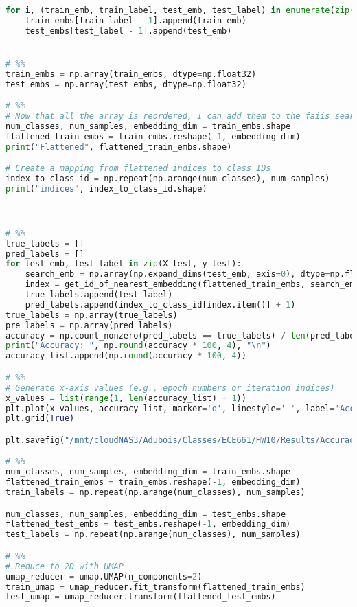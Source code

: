\documentclass{article}
\begin{document}
\begin{lstlisting}[language=Python]
for i, (train_emb, train_label, test_emb, test_label) in enumerate(zip(X_train, y_train, X_test, y_test)):
    train_embs[train_label - 1].append(train_emb)
    test_embs[test_label - 1].append(test_emb)


# %%
train_embs = np.array(train_embs, dtype=np.float32)
test_embs = np.array(test_embs, dtype=np.float32)

# %%
# Now that all the array is reordered, I can add them to the faiis search
num_classes, num_samples, embedding_dim = train_embs.shape
flattened_train_embs = train_embs.reshape(-1, embedding_dim)
print("Flattened", flattened_train_embs.shape)

# Create a mapping from flattened indices to class IDs
index_to_class_id = np.repeat(np.arange(num_classes), num_samples)
print("indices", index_to_class_id.shape)



# %%
true_labels = []
pred_labels = []
for test_emb, test_label in zip(X_test, y_test):
    search_emb = np.array(np.expand_dims(test_emb, axis=0), dtype=np.float32)
    index = get_id_of_nearest_embedding(flattened_train_embs, search_emb)
    true_labels.append(test_label)
    pred_labels.append(index_to_class_id[index.item()] + 1)
true_labels = np.array(true_labels)
pre_labels = np.array(pred_labels)
accuracy = np.count_nonzero(pred_labels == true_labels) / len(pred_labels)
print("Accuracy: ", np.round(accuracy * 100, 4), "\n")
accuracy_list.append(np.round(accuracy * 100, 4))

# %%
# Generate x-axis values (e.g., epoch numbers or iteration indices)
x_values = list(range(1, len(accuracy_list) + 1))
plt.plot(x_values, accuracy_list, marker='o', linestyle='-', label='Accuracy')
plt.grid(True)

plt.savefig("/mnt/cloudNAS3/Adubois/Classes/ECE661/HW10/Results/Accuracy/Autoencoder.jpg")

# %%
num_classes, num_samples, embedding_dim = train_embs.shape
flattened_train_embs = train_embs.reshape(-1, embedding_dim)
train_labels = np.repeat(np.arange(num_classes), num_samples)

num_classes, num_samples, embedding_dim = test_embs.shape
flattened_test_embs = test_embs.reshape(-1, embedding_dim)
test_labels = np.repeat(np.arange(num_classes), num_samples)

# %%
# Reduce to 2D with UMAP
umap_reducer = umap.UMAP(n_components=2)
train_umap = umap_reducer.fit_transform(flattened_train_embs)
test_umap = umap_reducer.transform(flattened_test_embs)


\end{lstlisting}
\end{document}
